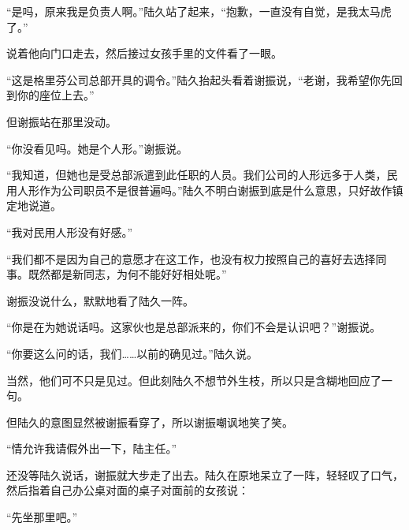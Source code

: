 “是吗，原来我是负责人啊。”陆久站了起来，“抱歉，一直没有自觉，是我太马虎了。”

说着他向门口走去，然后接过女孩手里的文件看了一眼。

“这是格里芬公司总部开具的调令。”陆久抬起头看着谢振说，“老谢，我希望你先回到你的座位上去。”

但谢振站在那里没动。

“你没看见吗。她是个人形。”谢振说。

“我知道，但她也是受总部派遣到此任职的人员。我们公司的人形远多于人类，民用人形作为公司职员不是很普遍吗。”陆久不明白谢振到底是什么意思，只好故作镇定地说道。

“我对民用人形没有好感。”

“我们都不是因为自己的意愿才在这工作，也没有权力按照自己的喜好去选择同事。既然都是新同志，为何不能好好相处呢。”

谢振没说什么，默默地看了陆久一阵。

“你是在为她说话吗。这家伙也是总部派来的，你们不会是认识吧？”谢振说。

“你要这么问的话，我们……以前的确见过。”陆久说。

当然，他们可不只是见过。但此刻陆久不想节外生枝，所以只是含糊地回应了一句。

但陆久的意图显然被谢振看穿了，所以谢振嘲讽地笑了笑。

“情允许我请假外出一下，陆主任。”

还没等陆久说话，谢振就大步走了出去。陆久在原地呆立了一阵，轻轻叹了口气，然后指着自己办公桌对面的桌子对面前的女孩说：

“先坐那里吧。”